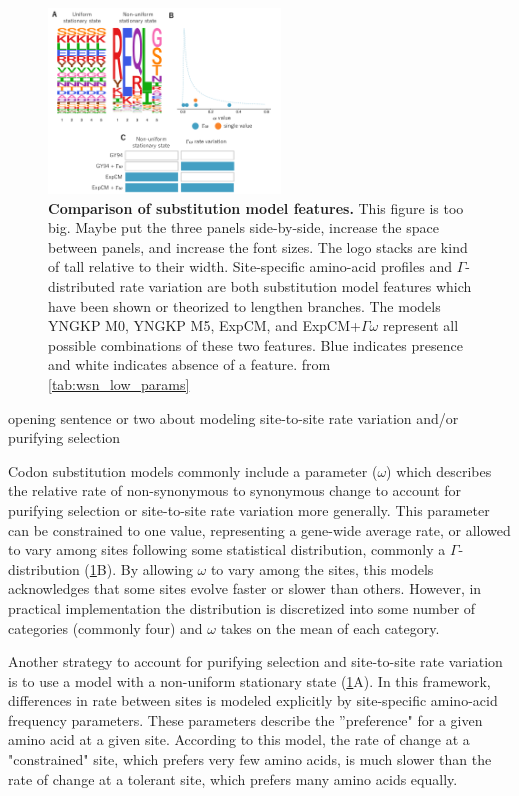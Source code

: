\documentclass[11pt]{article}
\newcommand\skhcomment[1]{{\color{magenta}#1}}
\newcommand\jdbcomment[1]{{\color{red}#1}}
\begin{document}
\begin{figure}[H]
\centerline{\includegraphics[width=0.55\textwidth]{figures/model_feature.pdf}}
\caption{\label{fig:model_feature}
\textbf{Comparison of substitution model features.}
\jdbcomment{This figure is too big. Maybe put the three panels side-by-side, increase the space between panels, and increase the font sizes. The logo stacks are kind of tall relative to their width.}
Site-specific amino-acid profiles and $\Gamma$-distributed rate variation are both substitution model features which have been shown or theorized to lengthen branches. 
The models YNGKP M0, YNGKP M5, ExpCM, and ExpCM+$\Gamma\omega$ represent all possible combinations of these two features. 
Blue indicates presence and white indicates absence of a feature. 
from \ref{tab:wsn_low_params}
}
\end{figure}

\skhcomment{opening sentence or two about modeling site-to-site rate variation and/or purifying selection}

Codon substitution models commonly include a parameter ($\omega$) which describes the relative rate of non-synonymous to synonymous change to account for purifying selection or site-to-site rate variation more generally. 
This parameter can be constrained to one value, representing a gene-wide average rate, or allowed to vary among sites following some statistical distribution, commonly a $\Gamma$-distribution (\ref{fig:model_feature}B). 
By allowing $\omega$ to vary among the sites, this models acknowledges that some sites evolve faster or slower than others. 
However, in practical implementation the distribution is discretized into some number of categories (commonly four) and $\omega$ takes on the mean of each category. 

Another strategy to account for purifying selection and site-to-site rate variation is to use a model with a non-uniform stationary state (\ref{fig:model_feature}A). 
In this framework, differences in rate between sites is modeled explicitly by site-specific amino-acid frequency parameters. 
These parameters describe the ''preference" for a given amino acid at a given site. 
According to this model, the rate of change at a "constrained" site, which prefers very few amino acids, is much slower than the rate of change at a tolerant site, which prefers many amino acids equally. 
\end{document}
